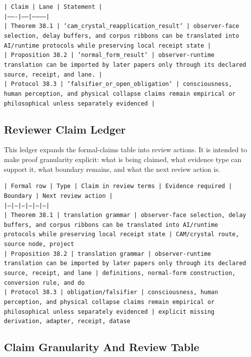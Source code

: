 \documentclass[11pt]{article}
\begin{document}
\noindent\texttt{| Claim | Lane | Statement |}\\
\noindent\texttt{|-------|------|-----------|}\\
\noindent\texttt{| Theorem 38.1 | `cam\_crystal\_reapplication\_result` | observer-face selection, delay buffers, and corpus ribbons can be translated into AI/runtime protocols while preserving local receipt state |}\\
\noindent\texttt{| Proposition 38.2 | `normal\_form\_result` | observer-runtime translation can be imported by later papers only through its declared source, receipt, and lane. |}\\
\noindent\texttt{| Protocol 38.3 | `falsifier\_or\_open\_obligation` | consciousness, human perception, and physical collapse claims remain empirical or philosophical unless separately evidenced |}\\

\subsection*{Reviewer Claim Ledger}

This ledger expands the formal-claims table into review actions. It is intended to make proof granularity explicit: what is being claimed, what evidence type can support it, what boundary remains, and what the next review action is.

\noindent\texttt{| Formal row | Type | Claim in review terms | Evidence required | Boundary | Next review action |}\\
\noindent\texttt{|---|---|---|---|---|---|}\\
\noindent\texttt{| Theorem 38.1 | translation grammar | observer-face selection, delay buffers, and corpus ribbons can be translated into AI/runtime protocols while preserving local receipt state | CAM/crystal route, source node, project}\\
\noindent\texttt{| Proposition 38.2 | translation grammar | observer-runtime translation can be imported by later papers only through its declared source, receipt, and lane | definitions, normal-form construction, conversion rule, and do}\\
\noindent\texttt{| Protocol 38.3 | obligation/falsifier | consciousness, human perception, and physical collapse claims remain empirical or philosophical unless separately evidenced | explicit missing derivation, adapter, receipt, datase}\\

\subsection*{Claim Granularity And Review Table}
\end{document}
